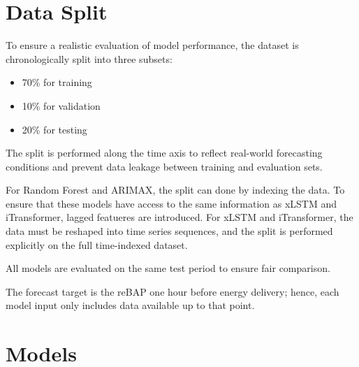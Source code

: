 \documentclass[class=scrbook, crop=false]{standalone}
\begin{document}
\section{Data Split}
\label{Section::Data_Split}
To ensure a realistic evaluation of model performance, the dataset is chronologically split into three subsets:
\begin{itemize}
\item 70\% for training
\item 10\% for validation
\item 20\% for testing
\end{itemize}

The split is performed along the time axis to reflect real-world forecasting conditions and prevent data leakage between training and evaluation sets.

For Random Forest and \gls{ARIMAX}, the split can done by indexing the data. To ensure that these models have access to the same information as xLSTM and iTransformer, lagged featueres are introduced. For xLSTM and iTransformer, the data must be reshaped into time series sequences, and the split is performed explicitly on the full time-indexed dataset.

All models are evaluated on the same test period to ensure fair comparison. 

The forecast target is the reBAP one hour before energy delivery; hence, each model input only includes data available up to that point.






\section{Models}
\label{Section::Models}
\end{document}
